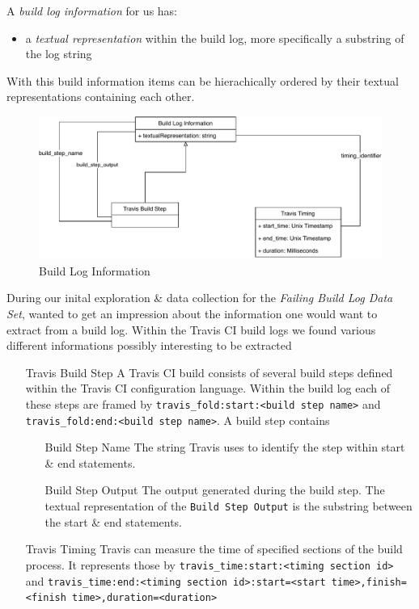 \documentclass[\myrootdir/main.tex]{subfiles}
\begin{document}
A \emph{build log information} for us has:
\begin{itemize}
	\item a \emph{textual representation} within the build log, more specifically a substring of the log string
\end{itemize}
With this build information items can be hierachically ordered by their textual representations containing each other.

\begin{figure}[h]
	\centering
	\includegraphics[width=\textwidth]{img/mt-graphics-BuildLogInformation.pdf}
	\caption{Build Log Information}
	\label{fig:build-log-information}
\end{figure}
During our inital exploration \& data collection for the \emph{Failing Build Log Data Set}, wanted to get an impression about the information one would want to extract from a build log. Within the Travis CI build logs we found various different informations possibly interesting to be extracted
\begin{itemize}
	\item[Travis Build Step] A Travis CI build consists of several build steps defined within the Travis CI configuration language. Within the build log each of these steps are framed by \lstinline{travis_fold:start:<build step name>} and \lstinline{travis_fold:end:<build step name>}.
	      A build step contains
	      \begin{itemize}
		      \item[Build Step Name] The string Travis uses to identify the step within start \& end statements.
		      \item[Build Step Output] The output generated during the build step. The textual representation of the \texttt{Build Step Output} is the substring between the start \& end statements.
	      \end{itemize}
	\item[Travis Timing] Travis can measure the time of specified sections of the build process. It represents those by \lstinline{travis_time:start:<timing section id>} and \lstinline{travis_time:end:<timing section id>:start=<start time>,finish=<finish time>,duration=<duration>}
\end{itemize}
\end{document}

